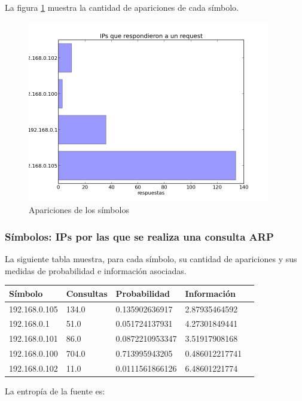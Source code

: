 \documentclass{article}
\begin{document}
La figura \ref{fig:red2repliers:count} muestra la cantidad de apariciones de
cada símbolo.

\begin{figure}[h!]
    \centering
    \includegraphics[width=300pt]{red2/red2repliers.png}
    \caption{Apariciones de los símbolos}
    \label{fig:red2repliers:count}
\end{figure}


\newpage

\subsubsection{Símbolos: IPs por las que se realiza una consulta ARP}
La siguiente tabla muestra, para cada símbolo, su cantidad de apariciones y
sus medidas de probabilidad e información asociadas.

\vskip10pt

\begin{tabular}{|l|l|l|l|l|}
  \hline
  Símbolo & Consultas & Probabilidad & Información \\
  \hline
  192.168.0.105 & 134.0 & 0.135902636917 & 2.87935464592\\
\hline
192.168.0.1 & 51.0 & 0.051724137931 & 4.27301849441\\
\hline
192.168.0.101 & 86.0 & 0.0872210953347 & 3.51917908168\\
\hline
192.168.0.100 & 704.0 & 0.713995943205 & 0.486012217741\\
\hline
192.168.0.102 & 11.0 & 0.0111561866126 & 6.48601221774\\
\hline
\end{tabular}

\vskip10pt

La entropía de la fuente es:
\end{document}
